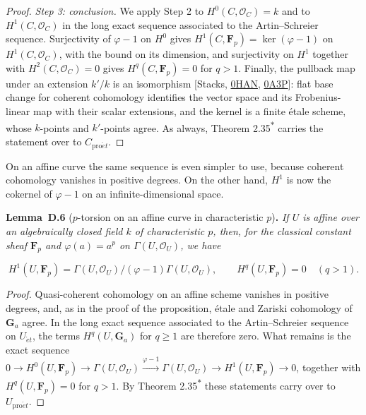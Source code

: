 \documentclass[11pt]{article}
\newenvironment{bpstatement}[2]{\par\addvspace{0.6\baselineskip}\noindent\textbf{#1}#2\textbf{.}\enspace\ignorespaces}
  {\par\addvspace{0.4\baselineskip}}
\newenvironment{bpstatementit}[2]{\begin{bpstatement}{#1}{#2}\itshape\ignorespaces}{\end{bpstatement}}
\newcommand{\bpout}[1]{#1\textsuperscript{\hyperlink{bp-outside}{\ensuremath{\ast}}}}
\begin{document}
\begin{proof}[{Proof}]
\emph{Step 3: conclusion.} We apply Step 2 to \(H^0(C,\mathcal O_C)=k\) and to \(H^1(C,\mathcal O_C)\) in the long exact sequence associated to the Artin–Schreier sequence. Surjectivity of \(\varphi-1\) on \(H^0\) gives \(H^1(C,\mathbf F_p)=\ker(\varphi-1)\) on \(H^1(C,\mathcal O_C)\), with the bound on its dimension, and surjectivity on \(H^1\) together with \(H^2(C,\mathcal O_C)=0\) gives \(H^q(C,\mathbf F_p)=0\) for \(q>1\). Finally, the pullback map under an extension \(k'/k\) is an isomorphism [Stacks, \href{https://stacks.math.columbia.edu/tag/0HAN}{0HAN}, \href{https://stacks.math.columbia.edu/tag/0A3P}{0A3P}]: flat base change for coherent cohomology identifies the vector space and its Frobenius-linear map with their scalar extensions, and the kernel is a finite étale scheme, whose \(k\)-points and \(k'\)-points agree. As always, Theorem \bpout{2.35} carries the statement over to \(C_{\mathrm{pro}\acute{e}t}\).
\end{proof}

\label{bp20}%
On an affine curve the same sequence is even simpler to use, because coherent cohomology vanishes in positive degrees. On the other hand, \(H^1\) is now the cokernel of \(\varphi-1\) on an infinite-dimensional space.

\label{bp21}%
\begin{bpstatementit}{Lemma~D.6}{ ($p$-torsion on an affine curve in characteristic $p$)}
If \(U\) is affine over an algebraically closed field \(k\) of characteristic \(p\), then, for the classical constant sheaf \(\mathbf F_p\) and \(\varphi(a)=a^p\) on \(\Gamma(U,\mathcal O_U)\), we have

\[
H^1(U,\mathbf F_p)=
\Gamma(U,\mathcal O_U)/(\varphi-1)\Gamma(U,\mathcal O_U),\qquad
H^q(U,\mathbf F_p)=0\quad(q>1).
\]
\end{bpstatementit}

\begin{proof}[{Proof}]\label{bp22}%
Quasi-coherent cohomology on an affine scheme vanishes in positive degrees, and, as in the proof of the proposition, étale and Zariski cohomology of \(\mathbf G_a\) agree. In the long exact sequence associated to the Artin–Schreier sequence on \(U_{\acute{e}t}\), the terms \(H^q(U,\mathbf G_a)\) for \(q\geq1\) are therefore zero. What remains is the exact sequence \(0\to H^0(U,\mathbf F_p)\to\Gamma(U,\mathcal O_U)\xrightarrow{\varphi-1}\Gamma(U,\mathcal O_U)\to H^1(U,\mathbf F_p)\to0\), together with \(H^q(U,\mathbf F_p)=0\) for \(q>1\).  By Theorem \bpout{2.35} these statements carry over to \(U_{\mathrm{pro}\acute{e}t}\).
\end{proof}
\end{document}
